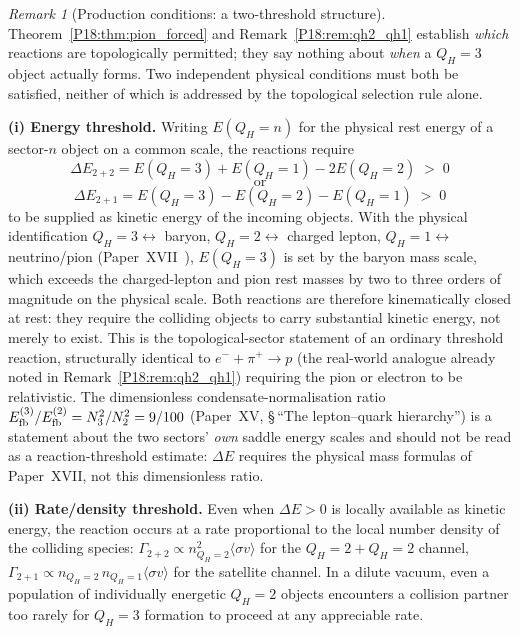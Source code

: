 \documentclass[11pt,a4paper]{article}
\theoremstyle{definition}\newtheorem{definition}[theorem]{Definition}
\theoremstyle{remark}
\newtheorem{remark}[theorem]{Remark}
\newcommand{\QH}{Q_H}
\begin{document}
\begin{remark}[Production conditions: a two-threshold structure]
\label{P18:rem:production_conditions}
Theorem~\ref{P18:thm:pion_forced} and Remark~\ref{P18:rem:qh2_qh1} establish
\emph{which} reactions are topologically permitted; they say nothing
about \emph{when} a $\QH=3$ object actually forms.  Two independent
physical conditions must both be satisfied, neither of which is
addressed by the topological selection rule alone.

\textbf{(i) Energy threshold.}  Writing $E(\QH{=}n)$ for the physical
rest energy of a sector-$n$ object on a common scale, the reactions
require
\[\Delta E_{2+2} = E(\QH{=}3)+E(\QH{=}1)-2E(\QH{=}2) \;>\;0\]
\[\qquad\text{or}\qquad\]
\[\Delta E_{2+1} = E(\QH{=}3)-E(\QH{=}2)-E(\QH{=}1) \;>\;0\]
to be supplied as kinetic energy of the incoming objects.  With the
physical identification $\QH=3\leftrightarrow$ baryon,
$\QH=2\leftrightarrow$ charged lepton, $\QH=1\leftrightarrow$
neutrino/pion (Paper~XVII~\cite{Paper17}), $E(\QH{=}3)$ is set by the
baryon mass scale, which exceeds the charged-lepton and pion rest
masses by two to three orders of magnitude on the physical scale.
Both reactions are therefore kinematically closed at rest: they
require the colliding objects to carry substantial kinetic energy,
not merely to exist.  This is the topological-sector statement of an
ordinary threshold reaction, structurally identical to
$e^-+\pi^+\to p$ (the real-world analogue already noted in
Remark~\ref{P18:rem:qh2_qh1}) requiring the pion or electron to be
relativistic.  The dimensionless condensate-normalisation ratio
$E_{\rm fb}^{(3)}/E_{\rm fb}^{(2)}=N_3^2/N_2^2=9/100$ (Paper~XV,
\S\,``The lepton--quark hierarchy'') is a statement about the two
sectors'
\emph{own} saddle energy scales and should not be read as a
reaction-threshold estimate: $\Delta E$ requires the physical mass
formulas of Paper~XVII, not this dimensionless ratio.

\textbf{(ii) Rate/density threshold.}  Even when $\Delta E>0$ is
locally available as kinetic energy, the reaction occurs at a rate
proportional to the local number density of the colliding species:
$\Gamma_{2+2}\propto n_{\QH=2}^2\langle\sigma v\rangle$ for the
$\QH{=}2+\QH{=}2$ channel, $\Gamma_{2+1}\propto
n_{\QH=2}\,n_{\QH=1}\langle\sigma v\rangle$ for the satellite channel.
In a dilute vacuum, even a population of individually energetic
$\QH=2$ objects encounters a collision partner too rarely for
$\QH=3$ formation to proceed at any appreciable rate.


\end{remark}
\end{document}
